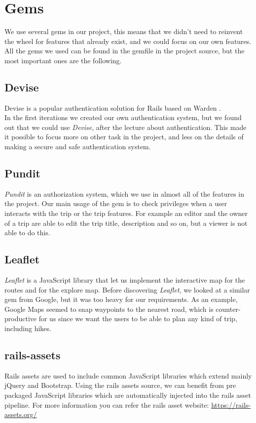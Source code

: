 \documentclass[a4paper]{article}
\begin{document}
\section{Gems}
We use several gems in our project, this means that we didn't need to reinvent the wheel for features that already exist, and we could focus on our own features. All the gems we used can be found in the gemfile in the project source, but the most important ones are the following.
\subsection{Devise}
Devise is a popular authentication solution for Rails based on Warden \cite{devise}. \\
In the first iterations we created our own authentication system, but we found out that we could use \textit{Devise}, after the lecture about authentication. This made it possible to focus more on other task in the project, and less on the details of making a secure and safe authentication system. 

\subsection{Pundit}
\textit{Pundit} is an authorization system\cite{pundit}, which we use in almost all of the features in the project. Our main usage of the gem is to check privileges when a user interacts with the trip or the trip features. For example an editor and the owner of a trip are able to edit the trip title, description and so on, but a viewer is not able to do this. 

\subsection{Leaflet}
\textit{Leaflet}\cite{leaflet} is a JavaScript library that let us implement the interactive map for the routes and for the explore map. Before discovering \textit{Leaflet}, we looked at a similar gem from Google, but it was too heavy for our requirements. As an example, Google Maps seemed to snap waypoints to the nearest road, which is counter-productive for us since we want the users to be able to plan any kind of trip, including hikes.

\subsection{rails-assets}
Rails assets are used to include common JavaScript libraries which extend mainly jQuery and Bootstrap. Using the rails assets source, we can benefit from pre packaged JavaScript libraries which are automatically injected into the rails asset pipeline. For more information you can refer the rails asset website: \url{https://rails-assets.org/}
\end{document}
